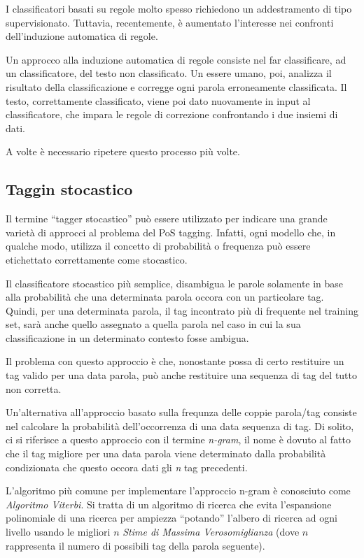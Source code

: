 I classificatori basati su regole molto spesso richiedono un addestramento di tipo supervisionato.
Tuttavia, recentemente, \`e aumentato l'interesse nei confronti dell'induzione automatica di regole.

Un approcco alla induzione automatica di regole consiste nel far classificare, ad un classificatore, del testo non classificato.
Un essere umano, poi, analizza il risultato della classificazione e corregge ogni parola erroneamente classificata.
Il testo, correttamente classificato, viene poi dato nuovamente in input al classificatore, che impara le regole di correzione confrontando i due insiemi di dati.

A volte \`e necessario ripetere questo processo pi\`u volte.

\subsection{Taggin stocastico}

Il termine ``tagger stocastico'' pu\`o essere utilizzato per indicare una grande variet\`a di approcci al problema del PoS tagging.
Infatti, ogni modello che, in qualche modo, utilizza il concetto di probabilit\`a o frequenza pu\`o essere etichettato correttamente come stocastico.

Il classificatore stocastico pi\`u semplice, disambigua le parole solamente in base alla probabilit\`a che una determinata parola occora con un particolare tag.
Quindi, per una determinata parola, il tag incontrato pi\`u di frequente nel training set, sar\`a anche quello assegnato a quella parola nel caso in cui la sua classificazione in un determinato contesto fosse ambigua.

Il problema con questo approccio \`e che, nonostante possa di certo restituire un tag valido per una data parola, pu\`o anche restituire una sequenza di tag del tutto non corretta.

Un'alternativa all'approccio basato sulla frequnza delle coppie parola/tag consiste nel calcolare la probabilit\`a dell'occorrenza di una data sequenza di tag.
Di solito, ci si riferisce a questo approccio con il termine \emph{n-gram}, il nome \`e dovuto al fatto che il tag migliore per una data parola viene determinato dalla probabilit\`a condizionata che questo occora dati gli \emph{n} tag precedenti.

L'algoritmo pi\`u comune per implementare l'approccio n-gram \`e conosciuto come \emph{Algoritmo Viterbi}.
Si tratta di un algoritmo di ricerca che evita l'espansione polinomiale di una ricerca per ampiezza ``potando'' l'albero di ricerca ad ogni livello usando le migliori $n$ \emph{Stime di Massima Verosomiglianza} (dove $n$ rappresenta il numero di possibili tag della parola seguente).

